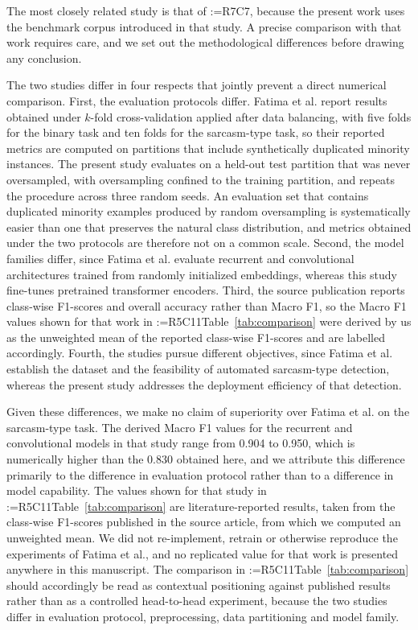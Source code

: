 \documentclass[a4paper,fleqn]{cas-sc}
\makeatletter
\newif\iftracked
\newcommand{\rv@setcolour}[1]{%
  \IfStrEq{#1}{R7C7}{\color{rvEdit}}{%
    \IfSubStr{#1}{R5}{\IfSubStr{#1}{R7}{\color{rvBoth}}{\color{rvFive}}}{\color{rvSeven}}}}
\newcommand{\rv@tag}[1]{\textsuperscript{\sffamily\bfseries\scriptsize[\StrSubstitute{#1}{,}{, }]}\,}
\newcommand{\rv@recordone}[1]{%
  \edef\rv@i{#1}%
  \ifcsdef{rv@n@\rv@i}{}{\csgdef{rv@n@\rv@i}{0}}%
  \csxdef{rv@n@\rv@i}{\the\numexpr\csuse{rv@n@\rv@i}+1\relax}%
  \begingroup\edef\@currentlabel{\rv@i}\label{rv:\rv@i:\csuse{rv@n@\rv@i}}\endgroup}
\newcommand{\rv@record}[1]{\@for\rv@id:=#1\do{\expandafter\rv@recordone\expandafter{\rv@id}}}
\DeclareRobustCommand{\rcrep}[3]{\rv@record{#1}\iftracked{\rv@setcolour{#1}\rv@tag{#1}\rv@strike{#2} #3}\else#3\fi}
\makeatother
\begin{document}
The most closely related study is that of \rcrep{R7C7}{Fatima et al. Fatima et al. (2024)}{\citet{fatima2024exploratory}}, because the present work uses the benchmark corpus introduced in that study. A precise comparison with that work requires care, and we set out the methodological differences before drawing any conclusion.

The two studies differ in four respects that jointly prevent a direct numerical comparison. First, the evaluation protocols differ. Fatima et al. report results obtained under $k$-fold cross-validation applied after data balancing, with five folds for the binary task and ten folds for the sarcasm-type task, so their reported metrics are computed on partitions that include synthetically duplicated minority instances. The present study evaluates on a held-out test partition that was never oversampled, with oversampling confined to the training partition, and repeats the procedure across three random seeds. An evaluation set that contains duplicated minority examples produced by random oversampling is systematically easier than one that preserves the natural class distribution, and metrics obtained under the two protocols are therefore not on a common scale. Second, the model families differ, since Fatima et al. evaluate recurrent and convolutional architectures trained from randomly initialized embeddings, whereas this study fine-tunes pretrained transformer encoders. Third, the source publication reports class-wise F1-scores and overall accuracy rather than Macro F1, so the Macro F1 values shown for that work in \rcrep{R5C11}{Table 13}{Table~\ref{tab:comparison}} were derived by us as the unweighted mean of the reported class-wise F1-scores and are labelled accordingly. Fourth, the studies pursue different objectives, since Fatima et al. establish the dataset and the feasibility of automated sarcasm-type detection, whereas the present study addresses the deployment efficiency of that detection.

Given these differences, we make no claim of superiority over Fatima et al. on the sarcasm-type task. The derived Macro F1 values for the recurrent and convolutional models in that study range from 0.904 to 0.950, which is numerically higher than the 0.830 obtained here, and we attribute this difference primarily to the difference in evaluation protocol rather than to a difference in model capability. The values shown for that study in \rcrep{R5C11}{Table 13}{Table~\ref{tab:comparison}} are literature-reported results, taken from the class-wise F1-scores published in the source article, from which we computed an unweighted mean. We did not re-implement, retrain or otherwise reproduce the experiments of Fatima et al., and no replicated value for that work is presented anywhere in this manuscript. The comparison in \rcrep{R5C11}{Table 13}{Table~\ref{tab:comparison}} should accordingly be read as contextual positioning against published results rather than as a controlled head-to-head experiment, because the two studies differ in evaluation protocol, preprocessing, data partitioning and model family.
\end{document}
